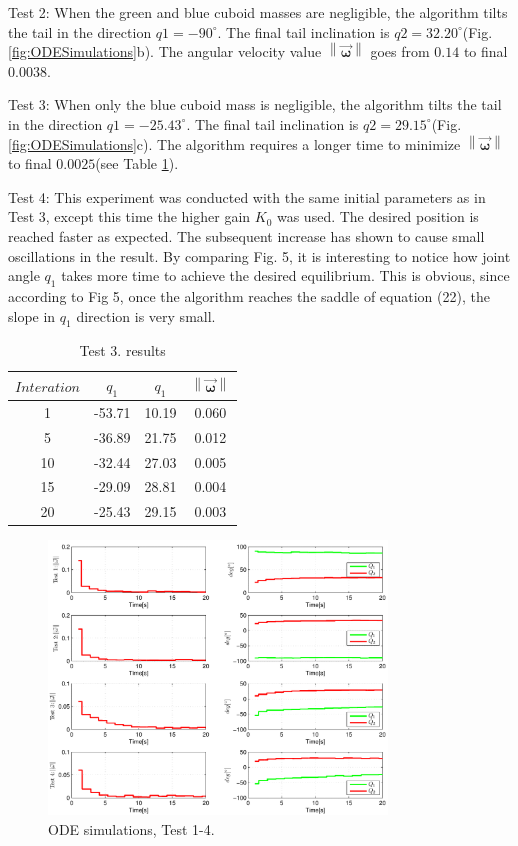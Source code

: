Test 2: When the green and blue cuboid masses are negligible, the algorithm tilts the tail in the direction $q1=-90^{\circ}$. The final tail inclination is $q2=32.20^{\circ}$(Fig. \ref{fig:ODESimulations}b). The angular velocity value $\left \| \vec{\boldsymbol{\omega}} \right \|$ goes from $0.14$ to final $0.0038$. 

Test 3: When only the blue cuboid mass is negligible, the algorithm tilts the tail in the direction $q1=-25.43^{\circ}$. The final tail inclination is $q2=29.15^{\circ}$(Fig. \ref{fig:ODESimulations}c). The algorithm requires a longer time to minimize $\left \| \vec{\boldsymbol{\omega}} \right \|$ to final $0.0025$(see Table \ref{tab:Simulations2}).

Test 4: This experiment was conducted with the same initial parameters as in Test 3, except this time the higher gain $K_0$ was used. The desired position is reached faster as expected. The subsequent increase has shown to cause small oscillations in the result. By comparing Fig. 5, it is interesting to notice how joint angle $q_1$ takes more time to achieve the desired equilibrium. This is obvious, since according to Fig 5, once the algorithm reaches the saddle of equation (22), the slope in $q_1$ direction is very small.

\begin{table}
	\centering
\begin{tabular}{|c|c|c|c|}
	\hline
$Interation$ & $q_1$ & $q_1$  & $\left \| \vec{\boldsymbol{\omega}} \right \|$\\
	\hline
1 & -53.71 & 10.19 & 0.060\\
5 & -36.89 & 21.75 & 0.012\\
10 & -32.44 & 27.03 &  0.005\\
15 & -29.09 & 28.81 & 0.004\\
20 & -25.43 & 29.15 &  0.003\\
\hline
\end{tabular}
\caption{Test 3. results}\label{tab:Simulations2}
\end{table}

\begin{figure}
	\centering
	\includegraphics[width=90mm]{./pictures/ODE_graph.pdf}
	\caption{ODE simulations, Test 1-4.}
	\label{fig:ODE graph}
\end{figure}


